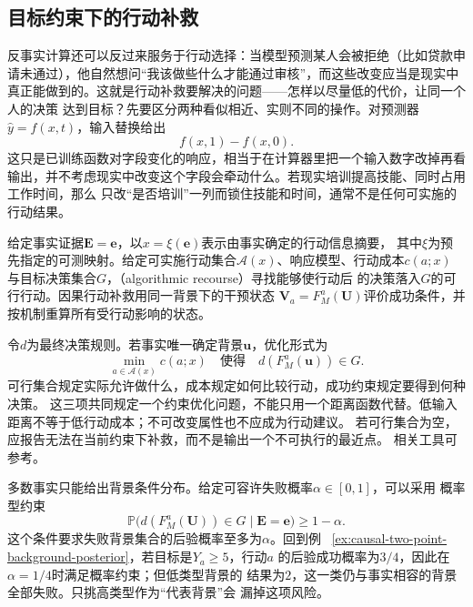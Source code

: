 \subsection{目标约束下的行动补救}
\label{sec:causal-action-recourse}

反事实计算还可以反过来服务于行动选择：当模型预测某人会被拒绝（比如贷款申请未通过），他自然想问“我该做些什么才能通过审核”，而这些改变应当是现实中真正能做到的。这就是行动补救要解决的问题——怎样以尽量低的代价，让同一个人的决策
达到目标？先要区分两种看似相近、实则不同的操作。对预测器\(\widehat y=f(x,t)\)，输入替换给出
\[
  f(x,1)-f(x,0).
\]
这只是已训练函数对字段变化的响应，相当于在计算器里把一个输入数字改掉再看输出，并不考虑现实中改变这个字段会牵动什么。若现实培训提高技能、同时占用工作时间，那么
只改“是否培训”一列而锁住技能和时间，通常不是任何可实施的行动结果。

\begin{definition}[因果行动补救]
  \label{def:causal-recourse}
  给定事实证据\(\bm E=\bm e\)，以\(x=\xi(\bm e)\)表示由事实确定的行动信息摘要，
  其中\(\xi\)为预先指定的可测映射。给定可实施行动集合\(\mathcal A(x)\)、响应模型、行动成本\(c(a;x)\)
  与目标决策集合\(G\)，（algorithmic recourse）寻找能够使行动后
  的决策落入\(G\)的可行行动。因果行动补救用同一背景下的干预状态
  \(\bm V_a=F_M^a(\bm U)\)评价成功条件，并按机制重算所有受行动影响的状态。
\end{definition}

令\(d\)为最终决策规则。若事实唯一确定背景\(\bm u\)，优化形式为
\begin{equation}
  \min_{a\in\mathcal A(x)}c(a;x)
  \quad\text{使得}\quad d(F_M^a(\bm u))\in G.
  \label{eq:causal-recourse-objective}
\end{equation}
可行集合规定实际允许做什么，成本规定如何比较行动，成功约束规定要得到何种决策。
这三项共同规定一个约束优化问题，不能只用一个距离函数代替。低输入距离不等于低行动成本；不可改变属性也不应成为行动建议。
若可行集合为空，应报告无法在当前约束下补救，而不是输出一个不可执行的最近点。
相关工具可参考。

多数事实只能给出背景条件分布。给定可容许失败概率\(\alpha\in[0,1]\)，可以采用
概率型约束
\begin{equation}
  \mathbb P\bigl(d(F_M^a(\bm U))\in G\mid\bm E=\bm e\bigr)
  \geq1-\alpha.
  \label{eq:causal-recourse-probability}
\end{equation}
这个条件要求失败背景集合的后验概率至多为\(\alpha\)。回到例
~\ref{ex:causal-two-point-background-posterior}，若目标是\(Y_a\geq5\)，行动\(a\)
的后验成功概率为\(3/4\)，因此在\(\alpha=1/4\)时满足概率约束；但低类型背景的
结果为\(2\)，这一类仍与事实相容的背景全部失败。只挑高类型作为“代表背景”会
漏掉这项风险。

